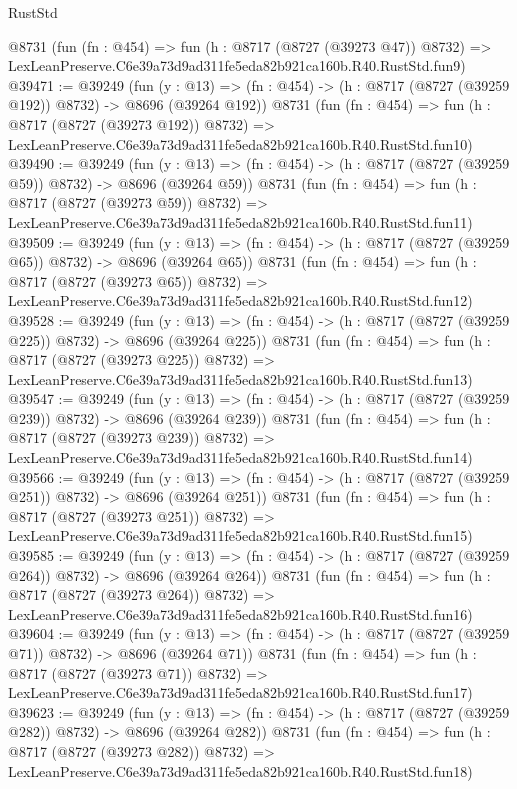 \begin{lexlean}{RustStd}
\begin{coremodule}
    @8731
    (fun (fn : @454) =>
    fun (h : @8717 (@8727 (@39273 @47)) @8732) =>
    LexLeanPreserve.C6e39a73d9ad311fe5eda82b921ca160b.R40.RustStd.fun9)
@39471 := @39249
    (fun (y : @13) => (fn : @454) -> (h : @8717 (@8727 (@39259 @192)) @8732) -> @8696 (@39264 @192))
    @8731
    (fun (fn : @454) =>
    fun (h : @8717 (@8727 (@39273 @192)) @8732) =>
    LexLeanPreserve.C6e39a73d9ad311fe5eda82b921ca160b.R40.RustStd.fun10)
@39490 := @39249
    (fun (y : @13) => (fn : @454) -> (h : @8717 (@8727 (@39259 @59)) @8732) -> @8696 (@39264 @59))
    @8731
    (fun (fn : @454) =>
    fun (h : @8717 (@8727 (@39273 @59)) @8732) =>
    LexLeanPreserve.C6e39a73d9ad311fe5eda82b921ca160b.R40.RustStd.fun11)
@39509 := @39249
    (fun (y : @13) => (fn : @454) -> (h : @8717 (@8727 (@39259 @65)) @8732) -> @8696 (@39264 @65))
    @8731
    (fun (fn : @454) =>
    fun (h : @8717 (@8727 (@39273 @65)) @8732) =>
    LexLeanPreserve.C6e39a73d9ad311fe5eda82b921ca160b.R40.RustStd.fun12)
@39528 := @39249
    (fun (y : @13) => (fn : @454) -> (h : @8717 (@8727 (@39259 @225)) @8732) -> @8696 (@39264 @225))
    @8731
    (fun (fn : @454) =>
    fun (h : @8717 (@8727 (@39273 @225)) @8732) =>
    LexLeanPreserve.C6e39a73d9ad311fe5eda82b921ca160b.R40.RustStd.fun13)
@39547 := @39249
    (fun (y : @13) => (fn : @454) -> (h : @8717 (@8727 (@39259 @239)) @8732) -> @8696 (@39264 @239))
    @8731
    (fun (fn : @454) =>
    fun (h : @8717 (@8727 (@39273 @239)) @8732) =>
    LexLeanPreserve.C6e39a73d9ad311fe5eda82b921ca160b.R40.RustStd.fun14)
@39566 := @39249
    (fun (y : @13) => (fn : @454) -> (h : @8717 (@8727 (@39259 @251)) @8732) -> @8696 (@39264 @251))
    @8731
    (fun (fn : @454) =>
    fun (h : @8717 (@8727 (@39273 @251)) @8732) =>
    LexLeanPreserve.C6e39a73d9ad311fe5eda82b921ca160b.R40.RustStd.fun15)
@39585 := @39249
    (fun (y : @13) => (fn : @454) -> (h : @8717 (@8727 (@39259 @264)) @8732) -> @8696 (@39264 @264))
    @8731
    (fun (fn : @454) =>
    fun (h : @8717 (@8727 (@39273 @264)) @8732) =>
    LexLeanPreserve.C6e39a73d9ad311fe5eda82b921ca160b.R40.RustStd.fun16)
@39604 := @39249
    (fun (y : @13) => (fn : @454) -> (h : @8717 (@8727 (@39259 @71)) @8732) -> @8696 (@39264 @71))
    @8731
    (fun (fn : @454) =>
    fun (h : @8717 (@8727 (@39273 @71)) @8732) =>
    LexLeanPreserve.C6e39a73d9ad311fe5eda82b921ca160b.R40.RustStd.fun17)
@39623 := @39249
    (fun (y : @13) => (fn : @454) -> (h : @8717 (@8727 (@39259 @282)) @8732) -> @8696 (@39264 @282))
    @8731
    (fun (fn : @454) =>
    fun (h : @8717 (@8727 (@39273 @282)) @8732) =>
    LexLeanPreserve.C6e39a73d9ad311fe5eda82b921ca160b.R40.RustStd.fun18)

\end{coremodule}
\end{lexlean}
